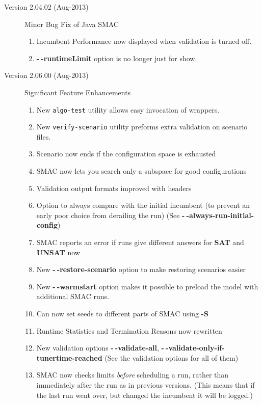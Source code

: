 \documentclass[11pt,letterpaper,oneside]{article}
\begin{document}
\begin{description}
\begin{enumerate}
			\end{enumerate}

			 \item[Version 2.04.02 (Aug-2013)] Minor Bug Fix of Java SMAC
	              \begin{enumerate}
                     \item Incumbent Performance now displayed when validation is turned off.
                     \item \textbf{-$~\!$-runtimeLimit} option is no longer just for show.
                  \end{enumerate}

			 \item[Version 2.06.00 (Aug-2013)] Significant Feature Enhancements
	              \begin{enumerate}
	              	 \item New \texttt{algo-test} utility allows easy invocation of wrappers.
	              	 \item New \texttt{verify-scenario} utility preforms extra validation on scenario files.
                     \item Scenario now ends if the configuration space is exhausted
					 \item SMAC now lets you search only a subspace for good configurations
					 \item Validation output formats improved with headers
					 \item Option to always compare with the initial incumbent (to prevent an early poor choice from derailing the run) (See \textbf{-$~\!$-always-run-initial-config})
					 \item SMAC reports an error if runs give different answers for \textbf{SAT} and \textbf{UNSAT} now
					 \item New \textbf{-$~\!$-restore-scenario} option to make restoring scenarios easier
					 \item New \textbf{-$~\!$-warmstart} option makes it possible to preload the model with additional SMAC runs.
					 \item Can now set seeds to different parts of SMAC using \textbf{-S}
					 \item Runtime Statistics and Termination Reasons now rewritten
					 \item New validation options \textbf{-$~\!$-validate-all}, \textbf{-$~\!$-validate-only-if-tunertime-reached} (See the validation options for all of them)
					 \item SMAC now checks limits \textit{before} scheduling a run, rather than immediately after the run as in previous versions. (This means that if the last run went over, but changed the incumbent it will be logged.)

\end{enumerate}
\end{description}
\end{document}
